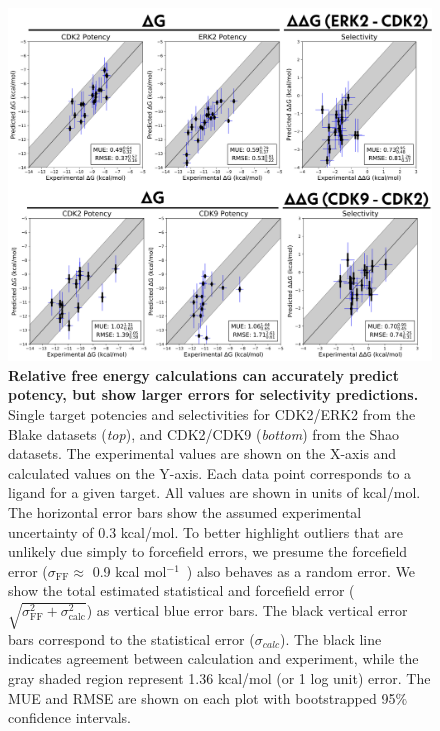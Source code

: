 \documentclass[phd,tocprelim]{cornell}
\begin{document}
\begin{landscape}
\begin{figure}
\centering
\includegraphics[width=0.6\linewidth]{figures/figure4.png}
\caption[Relative free energy calculations can accurately predict potency, but show larger errors for selectivity predictions.]{
{\bf Relative free energy calculations can accurately predict potency, but show larger errors for selectivity predictions.} \\
Single target potencies and selectivities for CDK2/ERK2 from the Blake datasets (\emph{top}), and CDK2/CDK9 (\emph{bottom}) from the Shao datasets. The experimental values are shown on the X-axis and calculated values on the Y-axis. Each data point corresponds to a ligand for a given target. All values are shown in units of kcal/mol. The horizontal error bars show the assumed experimental uncertainty of 0.3 kcal/mol\citep{BROWN2009420}. To better highlight outliers that are unlikely due simply to forcefield errors, we presume the forcefield error ($\sigma_\mathrm{FF} \approx$ 0.9 kcal mol$^{-1}$~\cite{Harder:J.Chem.TheoryComput.:2016}) also behaves as a random error. We show the total estimated statistical and forcefield error ($\sqrt{\sigma_\mathrm{FF}^2 + \sigma_\mathrm{calc}^2}$) as vertical blue error bars. The black vertical error bars correspond to the statistical error ($\sigma_{calc}$). The black line indicates agreement between calculation and experiment, while the gray shaded region represent 1.36 kcal/mol (or 1 log unit) error. The MUE and RMSE are shown on each plot with bootstrapped 95$\%$ confidence intervals.
}
\label{fig:figure-4}
\end{figure}
\end{landscape}
\end{document}
